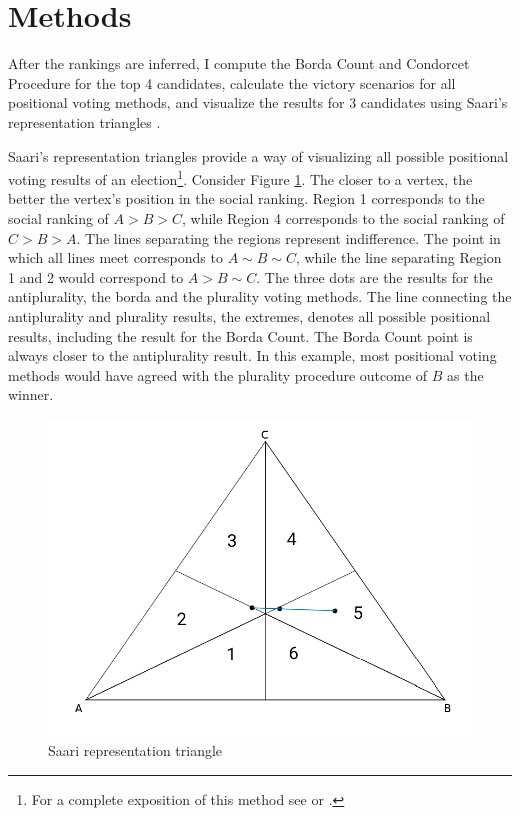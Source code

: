 \documentclass[hidelinks,11pt]{article}
\begin{document}
\section{Methods}


After the rankings are inferred, I compute the Borda Count and Condorcet
Procedure for the top 4 candidates, calculate the victory scenarios for all
positional voting methods, and visualize the results for 3 candidates using
Saari's representation triangles \parencite{saari2012geometry}.

Saari's representation triangles provide a way of visualizing all possible
positional voting results of an election\footnote{For a complete exposition of
  this method see \textcite{saari1995basic} or \textcite{nurmi2002voting}.}.
Consider Figure \ref{fig:saari_nurmi}. The closer to a vertex, the better the
vertex's position in the social ranking. Region 1 corresponds to the social
ranking of \(A > B > C\), while Region 4 corresponds to the social ranking of
\(C>B>A\). The lines separating the regions represent indifference. The point in
which all lines meet corresponds to \(A \sim B \sim C\), while the line
separating Region 1 and 2 would correspond to \(A > B \sim C\). The three dots
are the results for the antiplurality, the borda and the plurality voting
methods. The line connecting the antiplurality and plurality results, the
extremes, denotes all possible positional results, including the result for the
Borda Count. The Borda Count point is always closer to the antiplurality result.
In this example, most positional voting methods would have agreed with the
plurality procedure outcome of \(B\) as the winner.

\begin{figure}[H]
 \centering
 \includegraphics[width=0.8\columnwidth,
 height=0.3\textheight]{./images/simpletriangle.png}
 \caption{Saari representation triangle}
 \label{fig:saari_nurmi}
\end{figure}
\end{document}
